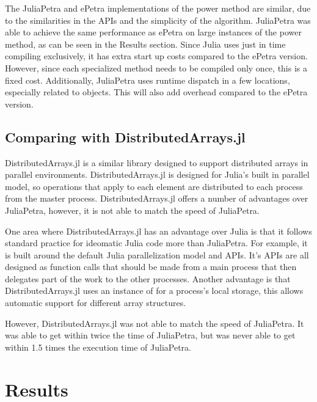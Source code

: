 \documentclass[acmsmall]{acmart}
\newcommand{\juliaSnippet}[1]{\texttt{\detokenize{#1}}}
\begin{document}
The JuliaPetra and ePetra implementations of the power method are similar, due to the similarities
in the APIs and the simplicity of the algorithm.
JuliaPetra was able to achieve the same performance as ePetra on large instances of the power method,
as can be seen in the Results section.
Since Julia uses just in time compiling exclusively, it has extra start up costs compared to
the ePetra version. However, since each specialized method needs to be compiled only once,
this is a fixed cost.
Additionally, JuliaPetra uses runtime dispatch in a few locations, especially related to
\juliaSnippet{Comm} objects.  This will also add overhead compared to the ePetra version.

\subsection{Comparing with DistributedArrays.jl}

DistributedArrays.jl is a similar library designed to support distributed arrays in parallel environments.
\cite{DAGithub}
DistributedArrays.jl is designed for Julia's built in parallel model, so operations that apply to
each element are distributed to each process from the master process.
DistributedArrays.jl offers a number of advantages over JuliaPetra, however, it is not able to
match the speed of JuliaPetra.

One area where DistributedArrays.jl has an advantage over Julia is that it follows standard
practice for ideomatic Julia code more than JuliaPetra.
For example, it is built around the default Julia parallelization model and APIs.
It's APIs are all designed as function calls that should be made from a main process that
then delegates part of the work to the other processes. %
Another advantage is that DistributedArrays.jl uses an instance of \juliaSnippet{AbstractArray}
for a process's local storage, this allows automatic support for different array structures.

However, DistributedArrays.jl was not able to match the speed of JuliaPetra.
It was able to get within twice the time of JuliaPetra, but was never able to get within 1.5 times
the execution time of JuliaPetra.

\section{Results}
\end{document}
